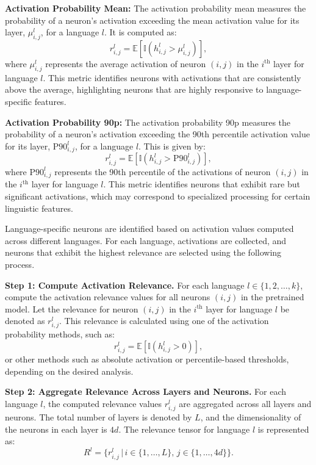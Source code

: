 \textbf{Activation Probability Mean:} The activation probability mean measures the probability of a neuron's activation exceeding the mean activation value for its layer, \(\mu_{i,j}^l\), for a language \(l\). It is computed as:
\begin{equation}
	r_{i,j}^l = \mathbb{E}\left[\mathbb{I}\left(h_{i,j}^l > \mu_{i,j}^l\right)\right],
\end{equation}
where \(\mu_{i,j}^l\) represents the average activation of neuron \((i, j)\) in the \(i^\text{th}\) layer for language \(l\). This metric identifies neurons with activations that are consistently above the average, highlighting neurons that are highly responsive to language-specific features.

\textbf{Activation Probability 90p:} The activation probability 90p measures the probability of a neuron's activation exceeding the 90th percentile activation value for its layer, \(\text{P90}_{i,j}^l\), for a language \(l\). This is given by:
\begin{equation}
	r_{i,j}^l = \mathbb{E}\left[\mathbb{I}\left(h_{i,j}^l > \text{P90}_{i,j}^l\right)\right],
\end{equation}
where \(\text{P90}_{i,j}^l\) represents the 90th percentile of the activations of neuron \((i, j)\) in the \(i^\text{th}\) layer for language \(l\). This metric identifies neurons that exhibit rare but significant activations, which may correspond to specialized processing for certain linguistic features.

Language-specific neurons are identified based on activation values computed across different languages. For each language, activations are collected, and neurons that exhibit the highest relevance are selected using the following process.

\textbf{Step 1: Compute Activation Relevance.} 
For each language \(l \in \{1, 2, \dots, k\}\), compute the activation relevance values for all neurons \((i, j)\) in the pretrained model. Let the relevance for neuron \((i, j)\) in the \(i^\text{th}\) layer for language \(l\) be denoted as \(r_{i,j}^l\). This relevance is calculated using one of the activation probability methods, such as:
\begin{equation}
	r_{i,j}^l = \mathbb{E}\left[\mathbb{I}\left(h_{i,j}^l > 0\right)\right],
\end{equation}
or other methods such as absolute activation or percentile-based thresholds, depending on the desired analysis.

\textbf{Step 2: Aggregate Relevance Across Layers and Neurons.} 
For each language \(l\), the computed relevance values \(r_{i,j}^l\) are aggregated across all layers and neurons. The total number of layers is denoted by \(L\), and the dimensionality of the neurons in each layer is \(4d\). The relevance tensor for language \(l\) is represented as:
\begin{equation}
	R^l = \{r_{i,j}^l \, | \, i \in \{1, \dots, L\}, \, j \in \{1, \dots, 4d\}\}.
\end{equation}

